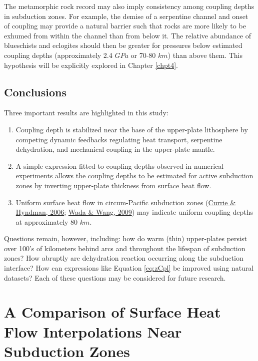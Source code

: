 The metamorphic rock record may also imply consistency among coupling depths in subduction zones. For example, the demise of a serpentine channel and onset of coupling may provide a natural barrier such that rocks are more likely to be exhumed from within the channel than from below it. The relative abundance of blueschists and eclogites should then be greater for pressures below estimated coupling depths (approximately 2.4 \(GPa\) or 70-80 \(km\)) than above them. This hypothesis will be explicitly explored in Chapter \ref{chpt4}.

\hypertarget{conclusions}{%
\section{Conclusions}\label{conclusions}}

Three important results are highlighted in this study:

\begin{enumerate}
\def\labelenumi{\arabic{enumi}.}
\tightlist
\item
  Coupling depth is stabilized near the base of the upper-plate lithosphere by competing dynamic feedbacks regulating heat transport, serpentine dehydration, and mechanical coupling in the upper-plate mantle.
\item
  A simple expression fitted to coupling depths observed in numerical experiments allows the coupling depths to be estimated for active subduction zones by inverting upper-plate thickness from surface heat flow.
\item
  Uniform surface heat flow in circum-Pacific subduction zones (\protect\hyperlink{ref-currie2006}{Currie \& Hyndman, 2006}; \protect\hyperlink{ref-wada2009}{Wada \& Wang, 2009}) may indicate uniform coupling depths at approximately 80 \(km\).
\end{enumerate}

Questions remain, however, including: how do warm (thin) upper-plates persist over 100's of kilometers behind arcs and throughout the lifespan of subduction zones? How abruptly are dehydration reaction occurring along the subduction interface? How can expressions like Equation \eqref{eq:zCpl} be improved using natural datasets? Each of these questions may be considered for future research.

\cleardoublepage

\hypertarget{chpt3}{%
\chapter{A Comparison of Surface Heat Flow Interpolations Near Subduction Zones}\label{chpt3}}

